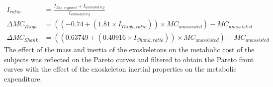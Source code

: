 \documentclass[10pt,letterpaper]{article}
\begin{document}
\begin{equation}\label{Eqn_AddingInertia_MetabolicRate}
\begin{aligned}
I_{ratio} &= \frac{I_{Exo,segment} + I_{un\textit{loaded}\;leg}}{I_{un\textit{loaded}\;leg}}\\
\Delta MC_{Thigh} &= ((-0.74 + (1.81\times I_{Thigh,ratio}))\times MC_{unassisted})-MC_{unassisted}\\
\Delta MC_{Shank} &= ((0.63749 + (0.40916\times I_{Shank,ratio}))\times MC_{unassisted})-MC_{unassisted}
\end{aligned}
\end{equation}
The effect of the mass and inertia of the exoskeletons on the metabolic cost of the subjects was reflected on the Pareto curves and filtered to obtain the Pareto front curves with the effect of the exoskeleton inertial properties on the metabolic expenditure.\\
\end{document}
